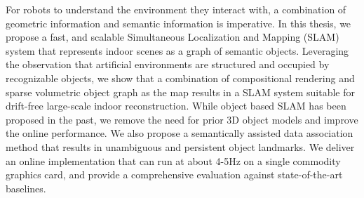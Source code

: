 
\setlength{\parskip}{1em}
\setlength{\parindent}{0em}

\noindent
For robots to understand the environment they interact with, a combination of geometric information and semantic information is imperative. In this thesis, we propose a fast, and scalable Simultaneous Localization and Mapping (SLAM) system that represents indoor scenes as a graph of semantic objects. Leveraging the observation that artificial environments are structured and occupied by recognizable objects, we show that a combination of compositional rendering and sparse volumetric object graph as the map results in a SLAM system suitable for drift-free large-scale indoor reconstruction. While object based SLAM has been proposed in the past, we remove the need for prior 3D object models and improve the online performance. We also propose a semantically assisted data association method that results in unambiguous and persistent object landmarks. We deliver an online implementation that can run at about 4-5Hz on a single commodity graphics card, and provide a comprehensive evaluation against state-of-the-art baselines.
